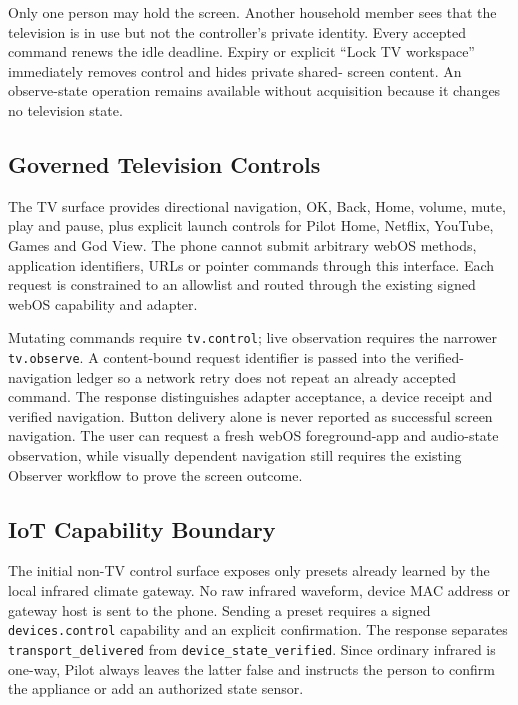 Only one person may hold the screen.  Another household member sees that the television is in use
but not the controller's private identity.  Every accepted command renews the idle deadline.
Expiry or explicit ``Lock TV workspace'' immediately removes control and hides private shared-
screen content.  An observe-state operation remains available without acquisition because it
changes no television state.

\subsection{Governed Television Controls}

The TV surface provides directional navigation, OK, Back, Home, volume, mute, play and pause, plus
explicit launch controls for Pilot Home, Netflix, YouTube, Games and God View.  The phone cannot
submit arbitrary webOS methods, application identifiers, URLs or pointer commands through this
interface.  Each request is constrained to an allowlist and routed through the existing signed
webOS capability and adapter.

Mutating commands require \texttt{tv.control}; live observation requires the narrower
\texttt{tv.observe}.  A content-bound request identifier is passed into the verified-navigation
ledger so a network retry does not repeat an already accepted command.  The response distinguishes
adapter acceptance, a device receipt and verified navigation.  Button delivery alone is never
reported as successful screen navigation.  The user can request a fresh webOS foreground-app and
audio-state observation, while visually dependent navigation still requires the existing Observer
workflow to prove the screen outcome.

\subsection{IoT Capability Boundary}

The initial non-TV control surface exposes only presets already learned by the local infrared
climate gateway.  No raw infrared waveform, device MAC address or gateway host is sent to the
phone.  Sending a preset requires a signed \texttt{devices.control} capability and an explicit
confirmation.  The response separates \texttt{transport\_delivered} from
\texttt{device\_state\_verified}.  Since ordinary infrared is one-way, Pilot always leaves the
latter false and instructs the person to confirm the appliance or add an authorized state sensor.

